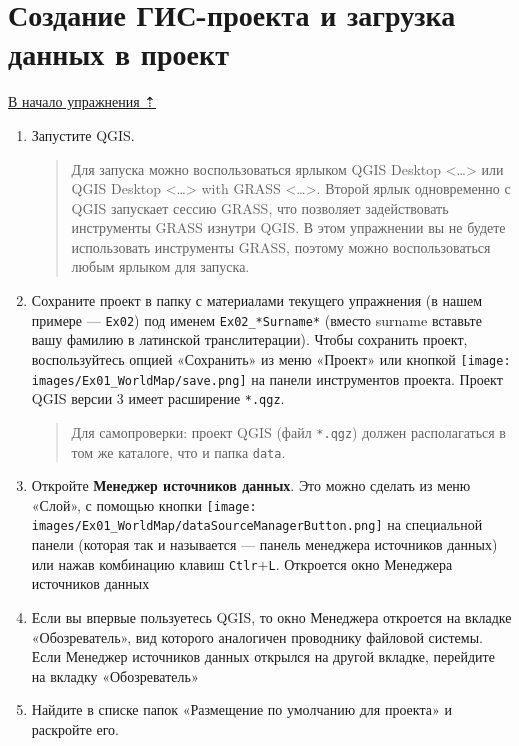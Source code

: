 \documentclass[
  12pt,
]{book}
\begin{document}
\hypertarget{map-design-world-qgis-project}{%
\section{Создание ГИС-проекта и загрузка данных в проект}\label{map-design-world-qgis-project}}

\protect\hyperlink{map-design-world}{В начало упражнения ⇡}

\begin{enumerate}
\def\labelenumi{\arabic{enumi}.}
\item
  Запустите QGIS.

  \begin{quote}
  Для запуска можно воспользоваться ярлыком QGIS Desktop \textless\ldots\textgreater{} или QGIS Desktop \textless\ldots\textgreater{} with GRASS \textless\ldots\textgreater. Второй ярлык одновременно с QGIS запускает сессию GRASS, что позволяет задействовать инструменты GRASS изнутри QGIS. В этом упражнении вы не будете использовать инструменты GRASS, поэтому можно воспользоваться любым ярлыком для запуска.
  \end{quote}
\item
  Сохраните проект в папку с материалами текущего упражнения (в нашем примере --- \texttt{Ex02}) под именем \texttt{Ex02\_*Surname*} (вместо surname вставьте вашу фамилию в латинской транслитерации). Чтобы сохранить проект, воспользуйтесь опцией «Сохранить» из меню «Проект» или кнопкой \texttt{[image: images/Ex01\_WorldMap/save.png]} на панели инструментов проекта. Проект QGIS версии 3 имеет расширение \texttt{*.qgz}.

  \begin{quote}
  Для самопроверки: проект QGIS (файл \texttt{*.qgz}) должен располагаться в том же каталоге, что и папка \texttt{data}.
  \end{quote}
\item
  Откройте \textbf{Менеджер источников данных}. Это можно сделать из меню «Слой», с помощью кнопки \texttt{[image: images/Ex01\_WorldMap/dataSourceManagerButton.png]} на специальной панели (которая так и называется --- панель менеджера источников данных) или нажав комбинацию клавиш \texttt{Ctlr}+\texttt{L}. Откроется окно Менеджера источников данных
\item
  Если вы впервые пользуетесь QGIS, то окно Менеджера откроется на вкладке «Обозреватель», вид которого аналогичен проводнику файловой системы. Если Менеджер источников данных открылся на другой вкладке, перейдите на вкладку «Обозреватель»
\item
  Найдите в списке папок «Размещение по умолчанию для проекта» и раскройте его.
\end{enumerate}
\end{document}
